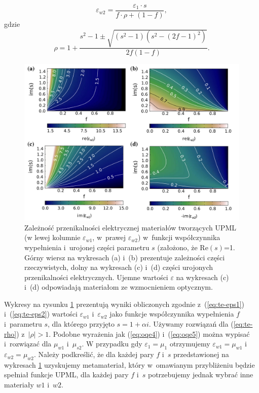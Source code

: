 \begin{equation}
	\varepsilon_{w2}=\frac{\varepsilon_1 \cdot s}{f\cdot \rho + (1-f)},
	\label{eq:te-eps2}
\end{equation}
gdzie
\begin{equation}
	\rho = 1+\frac{s^2-1 \pm \sqrt{(s^2-1)(s^2-(2f-1)^2)}}{2f(1-f)}.
	\label{eq:te-rho}
\end{equation}

\begin{figure}[tb]
	\includegraphics[width=\textwidth]{images/pml/oqe_materials.png}
	\caption{Zależność przenikalności elektrycznej materiałów tworzących UPML (w lewej kolumnie $\varepsilon_{w1}$, w~prawej $\varepsilon_{w2}$) w~funkcji współczynnika wypełnienia i~urojonej części parametru $s$ (założono, że $\textrm{Re}(s)$=1. Górny wiersz na wykresach (a) i~(b) prezentuje zależności części rzeczywistych, dolny na wykresach (c) i~(d) części urojonych przenikalności elektrycznych. Ujemne wartości $\varepsilon$ na wykresach (c) i~(d) odpowiadają materiałom ze wzmocnieniem optycznym. }
	\label{fig:upml-eps-s-f}
\end{figure}

Wykresy na rysunku \ref{fig:upml-eps-s-f} prezentują wyniki obliczonych zgodnie z~(\ref{eq:te-eps1}) i~(\ref{eq:te-eps2}) wartości $\varepsilon_{w1}$ i~$\varepsilon_{w2}$ jako funkcje współczynnika wypełnienia $f$ i~parametru $s$, dla którego przyjęto $s=1+\alpha i$. Używamy rozwiązań dla (\ref{eq:te-rho}) z~$|\rho|>1$. Podobne wyrażenia jak (\ref{eq:oqe4}) i~(\ref{eq:oqe5}) można wypisać i~rozwiązać dla $\mu_{w1}$ i~$\mu_{s2}$. W przypadku gdy $\varepsilon_1=\mu_1$ otrzymujemy $\varepsilon_{w1}=\mu_{w1}$ i~$\varepsilon_{w2}=\mu_{w2}$. Należy podkreślić, że dla każdej pary $f$ i~$s$ przedstawionej na wykresach \ref{fig:upml-eps-s-f} uzyskujemy metamateriał, który w~omawianym przybliżeniu będzie spełniał funkcje UPML, dla każdej pary $f$ i~$s$ potrzebujemy jednak wybrać inne materiały $w1$ i~$w2$.

